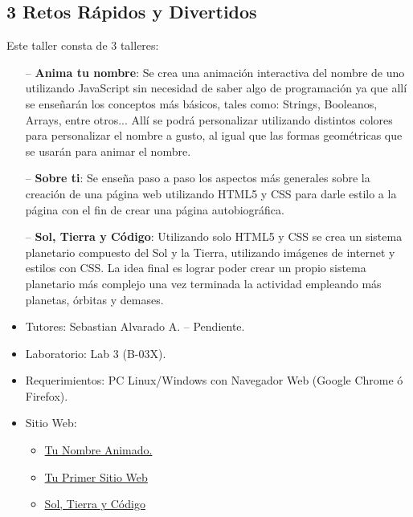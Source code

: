 \documentclass[letterpaper,12pt]{article}
\begin{document}
\subsection{3 Retos Rápidos y Divertidos}

Este taller consta de 3 talleres: 

\begin{itemize}
  \item[--]\textbf{Anima tu nombre}: Se crea una animación interactiva del nombre de uno utilizando JavaScript sin necesidad de saber algo de programación ya que allí se enseñarán los conceptos más básicos, tales como: Strings, Booleanos, Arrays, entre otros... Allí se podrá personalizar utilizando distintos colores para personalizar el nombre a gusto, al igual que las formas geométricas que se usarán para animar el nombre.
  \item[--] \textbf{Sobre ti}: Se enseña paso a paso los aspectos más generales sobre la creación de una página web utilizando HTML5 y CSS para darle estilo a la página con el fin de crear una página autobiográfica.
  \item[--] \textbf{Sol, Tierra y Código}: Utilizando solo HTML5 y CSS se crea un sistema planetario compuesto del Sol y la Tierra, utilizando imágenes de internet y estilos con CSS. La idea final es lograr poder crear un propio sistema planetario más complejo una vez terminada la actividad empleando más planetas, órbitas y demases.
\end{itemize}

\begin{itemize}
  \item Tutores: Sebastian Alvarado A. -- Pendiente.
  \item Laboratorio: Lab 3 (B-03X).
  \item Requerimientos: PC Linux/Windows con Navegador Web (Google Chrome ó Firefox).
  \item Sitio Web: 
    \begin{itemize}
      \item \href{https://www.codecademy.com/courses/animate-your-name/0/1}{Tu Nombre Animado.}
      \item \href{https://www.codecademy.com/en/courses/web-beginner-en-3pc6w/0/1}{Tu Primer Sitio Web}
      \item \href{https://www.codecademy.com/courses/web-beginner-en-ymqg0/0/1}{Sol, Tierra y Código}
    \end{itemize}

\end{itemize}
\end{document}
